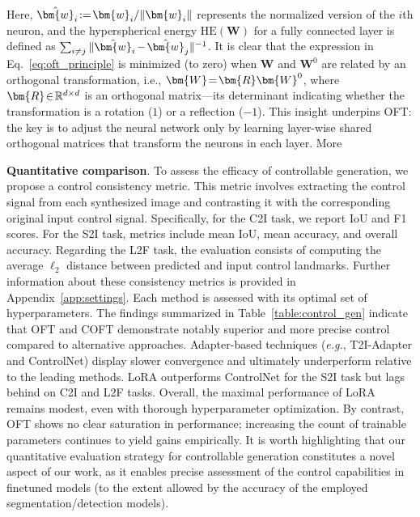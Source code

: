 \begin{itemize}[leftmargin=*,nosep]

Here, $\thickmuskip=2mu \medmuskip=2mu \hat{\bm{w}}_i:=\bm{w}_i/\|\bm{w}_i\|$ represents the normalized version of the $i$th neuron, and the hyperspherical energy $\text{HE}(\bm{W})$ for a fully connected layer is defined as $\thickmuskip=2mu \medmuskip=2mu \sum_{i\neq j} \|\hat{\bm{w}}_i-\hat{\bm{w}}_j\|^{-1}$. It is clear that the expression in Eq.~\eqref{eq:oft_principle} is minimized (to zero) when $\bm{W}$ and $\bm{W}^0$ are related by an orthogonal transformation, i.e., $\thickmuskip=2mu \medmuskip=2mu \bm{W}=\bm{R}\bm{W}^0$, where $\thickmuskip=2mu \medmuskip=2mu \bm{R}\in\mathbb{R}^{d\times d}$ is an orthogonal matrix—its determinant indicating whether the transformation is a rotation ($1$) or a reflection ($-1$). This insight underpins OFT: the key is to adjust the neural network only by learning layer-wise shared orthogonal matrices that transform the neurons in each layer. More

\textbf{Quantitative comparison}. To assess the efficacy of controllable generation, we propose a control consistency metric. This metric involves extracting the control signal from each synthesized image and contrasting it with the corresponding original input control signal. Specifically, for the C2I task, we report IoU and F1 scores. For the S2I task, metrics include mean IoU, mean accuracy, and overall accuracy. Regarding the L2F task, the evaluation consists of computing the average $\ell_2$ distance between predicted and input control landmarks. Further information about these consistency metrics is provided in Appendix~\ref{app:settings}. Each method is assessed with its optimal set of hyperparameters. The findings summarized in Table~\ref{table:control_gen} indicate that OFT and COFT demonstrate notably superior and more precise control compared to alternative approaches. Adapter-based techniques (\emph{e.g.}, T2I-Adapter and ControlNet) display slower convergence and ultimately underperform relative to the leading methods. LoRA outperforms ControlNet for the S2I task but lags behind on C2I and L2F tasks. Overall, the maximal performance of LoRA remains modest, even with thorough hyperparameter optimization. By contrast, OFT shows no clear saturation in performance; increasing the count of trainable parameters continues to yield gains empirically. It is worth highlighting that our quantitative evaluation strategy for controllable generation constitutes a novel aspect of our work, as it enables precise assessment of the control capabilities in finetuned models (to the extent allowed by the accuracy of the employed segmentation/detection models).


\end{itemize}
